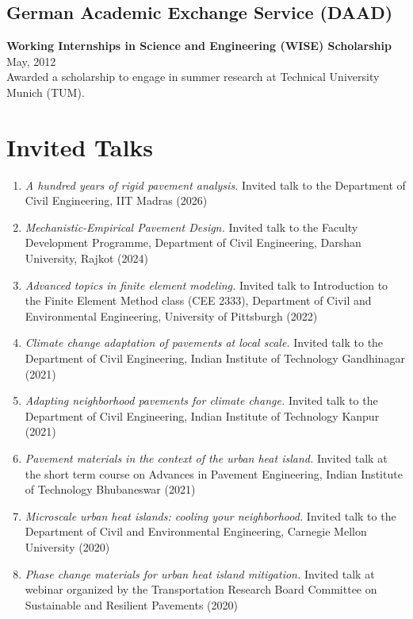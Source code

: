 \documentclass[12pt]{article}
\begin{document}
\subsection*{German Academic Exchange Service (DAAD)}
\textbf{Working Internships in Science and Engineering (WISE) Scholarship} \hfill May, 2012 \\
Awarded a scholarship to engage in summer research at Technical University Munich (TUM). 

\bigskip
\section*{Invited Talks}
\hfill
\begin{enumerate}
	\item \textit{A hundred years of rigid pavement analysis.} Invited talk to the Department of Civil Engineering, IIT Madras (2026)
	\item \textit{Mechanistic-Empirical Pavement Design.} Invited talk to the Faculty Development Programme, Department of Civil Engineering, Darshan University, Rajkot (2024)
	\item \textit{Advanced topics in finite element modeling.} Invited talk to Introduction to the Finite Element Method class (CEE 2333), Department of Civil and Environmental Engineering, University of Pittsburgh (2022)
	\item \textit{Climate change adaptation of pavements at local scale.} Invited talk to the Department of Civil Engineering, Indian Institute of Technology Gandhinagar (2021)	
	\item \textit{Adapting neighborhood pavements for climate change.} Invited talk to the Department of Civil Engineering, Indian Institute of Technology Kanpur (2021)	
	\item \textit{Pavement materials in the context of the urban heat island.} Invited talk at the short term course on Advances in Pavement Engineering, Indian Institute of Technology Bhubaneswar (2021)	
	\item \textit{Microscale urban heat islands: cooling your neighborhood.} Invited talk to the Department of Civil and Environmental Engineering, Carnegie Mellon University (2020)
	\item \textit{Phase change materials for urban heat island mitigation.} Invited talk at webinar organized by the Transportation Research Board Committee on Sustainable and Resilient Pavements (2020)
\end{enumerate}
\end{document}

